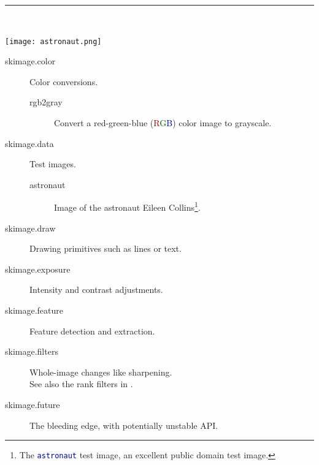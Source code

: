 \documentclass[nohyper, %
               ]{tufte-handout}
\newcommand{\rgb}{\textcolor{DarkRed}{R}\textcolor{DarkGreen}{G}\textcolor{DarkBlue}{B}}
\newcommand{\pyblue}[1]{\textcolor{DarkBlue}{\pyv{#1}}}
\begin{document}
  \noindent%
  \begingroup%
    \begin{center}%
      \textcolor{DarkGray}{\rule{0.7\textwidth}{.4pt}}\\%
    \end{center}%
  \endgroup%

  \begin{marginfigure}[0cm]%
    \texttt{[image: astronaut.png]}%
    \label{fig:astronaut}%
  \end{marginfigure}%
  \begin{description}%
    \item[skimage.color] Color conversions.
    \begin{description}
      \item[rgb2gray] Convert a red-green-blue (\rgb) color image to grayscale.
    \end{description}
    \item[skimage.data] Test images.
    \begin{description}
      \item[astronaut] Image of the astronaut Eileen Collins\footnote[2][-0.2cm]{The \textcolor{DarkBlue}{\texttt{astronaut}} test image, an excellent public domain test image.}.
    \end{description}
    \item[skimage.draw] Drawing primitives such as lines or text.
    \item[skimage.exposure] Intensity and contrast adjustments.
    \item[skimage.feature] Feature detection and extraction.
    \item[skimage.filters] Whole-image changes like sharpening. \hfill \\See also the rank filters in \pyblue{skimage.filters.rank}.
    \item[skimage.future] The bleeding edge, with potentially unstable API.

\end{description}
\end{document}
